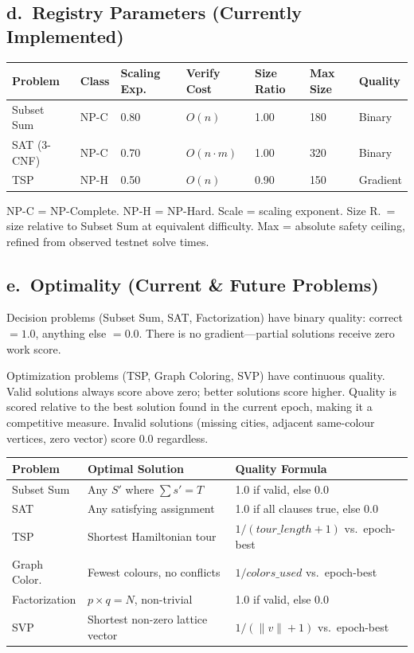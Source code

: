\documentclass[12pt,letterpaper]{article}
\begin{document}
\subsection*{d.\ Registry Parameters (Currently Implemented)}

\begin{center}
\begin{tabular}{L{2.2cm}C{1.1cm}C{1.4cm}C{1.6cm}C{1.4cm}C{1.4cm}C{1.4cm}}
\toprule
Problem & Class & Scaling Exp. & Verify Cost & Size Ratio & Max Size & Quality \\
\midrule
Subset Sum  & NP-C & 0.80 & $O(n)$     & 1.00 & 180 & Binary   \\
SAT (3-CNF) & NP-C & 0.70 & $O(n{\cdot}m)$ & 1.00 & 320 & Binary   \\
TSP         & NP-H & 0.50 & $O(n)$     & 0.90 & 150 & Gradient \\
\bottomrule
\end{tabular}
\end{center}

\noindent\small NP-C = NP-Complete. NP-H = NP-Hard. Scale = scaling exponent.
Size R.\ = size relative to Subset Sum at equivalent difficulty.
Max = absolute safety ceiling, refined from observed testnet solve times.
\normalsize

\subsection*{e.\ Optimality (Current \& Future Problems)}

Decision problems (Subset Sum, SAT, Factorization) have binary quality: correct $= 1.0$, anything
else $= 0.0$. There is no gradient---partial solutions receive zero work score.

Optimization problems (TSP, Graph Coloring, SVP) have continuous quality. Valid solutions always score
above zero; better solutions score higher. Quality is scored relative to the best solution found in the
current epoch, making it a competitive measure. Invalid solutions (missing cities, adjacent same-colour
vertices, zero vector) score 0.0 regardless.

\begin{center}
\begin{tabular}{L{2.4cm}L{3.6cm}L{4.8cm}}
\toprule
Problem & Optimal Solution & Quality Formula \\
\midrule
Subset Sum    & Any $S'$ where $\sum s' = T$         & 1.0 if valid, else 0.0 \\
SAT           & Any satisfying assignment             & 1.0 if all clauses true, else 0.0 \\
TSP           & Shortest Hamiltonian tour             & $1/(\mathit{tour\_length}+1)$ vs.\ epoch-best \\
Graph Color.  & Fewest colours, no conflicts          & $1/\mathit{colors\_used}$ vs.\ epoch-best \\
Factorization & $p \times q = N$, non-trivial         & 1.0 if valid, else 0.0 \\
SVP           & Shortest non-zero lattice vector      & $1/(\|v\|+1)$ vs.\ epoch-best \\
\bottomrule
\end{tabular}
\end{center}
\end{document}
